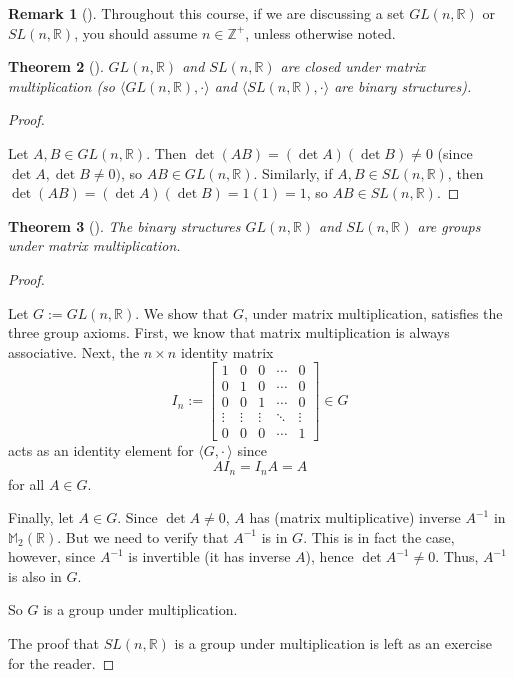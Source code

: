 \documentclass[10pt,]{book}
\theoremstyle{plain}
\newtheorem{theorem}{Theorem}[section]
\theoremstyle{definition}
\theoremstyle{definition}
\newtheorem{remark}[theorem]{Remark}
\theoremstyle{definition}
\theoremstyle{definition}
\numberwithin{equation}{section}
\def\Z{\mathbb{Z}}
\def\R{\mathbb{R}}
\def\M{\mathbb{M}}
\newcommand{\amp}{&}
\begin{document}
\begin{remark}[]\label{remark-8}
Throughout this course, if we are discussing a set \(GL(n,\R)\) or \(SL(n,\R)\), you should assume \(n\in \Z^+\), unless otherwise noted.%
\end{remark}
\begin{theorem}[{}]\label{glsl}
\(GL(n,\R)\) and \(SL(n,\R)\) are closed under matrix multiplication (so \(\langle GL(n,\R),\cdot\rangle\) and \(\langle SL(n,\R),\cdot\rangle\) are binary structures).%
\end{theorem}
\begin{proof}\hypertarget{proof-7}{}
Let \(A,B\in GL(n, \R)\). Then \(\det(AB)=(\det A)(\det B) \neq 0\) (since \(\det A, \det B \neq 0)\), so \(AB\in GL(n,\R)\). Similarly, if \(A,B \in SL(n,\R)\), then \(\det(AB)=(\det A)(\det B)=1(1)=1\), so \(AB\in SL(n,\R)\).%
\end{proof}
\begin{theorem}[{}]\label{theorem-8}
The binary structures \(GL(n,\R)\) and \(SL(n,\R)\) are groups under matrix multiplication.%
\end{theorem}
\begin{proof}\hypertarget{proof-8}{}
Let \(G:=GL(n,\R)\). We show that \(G\), under matrix multiplication, satisfies the three group axioms. First, we know that matrix multiplication is always associative. Next, the \(n\times n\) identity matrix%
\begin{equation*}
I_n:=\begin{bmatrix}1 \amp  0 \amp  0 \amp  \cdots \amp  0 \\
0 \amp  1 \amp  0 \amp  \cdots \amp  0 \\
0 \amp  0 \amp  1 \amp  \cdots \amp  0 \\
\vdots \amp  \vdots \amp  \vdots \amp  \ddots \amp  \vdots \\
0 \amp  0 \amp  0 \amp  \cdots \amp  1
\end{bmatrix}  \in G
\end{equation*}
acts as an identity element for \(\langle G, \cdot\,\rangle\) since%
\begin{equation*}
AI_n=I_nA = A
\end{equation*}
for all \(A\in G\).%
\par
Finally, let \(A\in G\).  Since \(\det A\neq 0\), \(A\) has (matrix multiplicative) inverse \(A^{-1}\) in \(\M_2(\R)\). But we need to verify that \(A^{-1}\) is in \(G\). This is in fact the case, however, since \(A^{-1}\) is invertible (it has inverse \(A\)), hence \(\det
A^{-1} \neq 0\).  Thus, \(A^{-1}\) is also in \(G\).%
\par
So \(G\) is a group under multiplication.%
\par
The proof that \(SL(n,\R)\) is a group under multiplication is left as an exercise for the reader.%
\end{proof}
\end{document}
